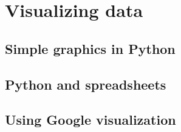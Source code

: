 \chapter{Visualizing data}

\section{Simple graphics in Python}

\section{Python and spreadsheets}

\section{Using Google visualization}



